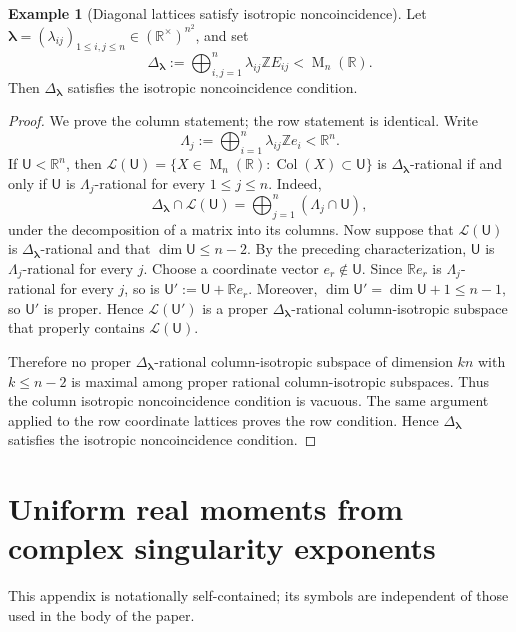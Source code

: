 \documentclass[reqno,11pt]{amsart}
\numberwithin{equation}{section}
\theoremstyle{definition}
\newtheorem{example}[theorem]{Example}
\theoremstyle{remark}
\newcommand{\op}{\operatorname}
\newcommand{\M}{\op{M}}
\begin{document}
\begin{example}[Diagonal lattices satisfy isotropic noncoincidence]
\label{ex:diagonal-isotropically-noncoincident}
Let $\boldsymbol\lambda=(\lambda_{ij})_{1\le i,j\le n}\in(\mathbb R^\times)^{n^2}$, and set
$$
\Delta_{\boldsymbol\lambda}
:=
\bigoplus_{i,j=1}^n \lambda_{ij}\mathbb Z E_{ij}
<\M_n(\mathbb R).
$$
 Then $\Delta_{\boldsymbol\lambda}$ satisfies the
isotropic noncoincidence condition.
\end{example}

\begin{proof}
We prove the column statement; the row statement is identical. Write
$$
\Lambda_j:=\bigoplus_{i=1}^n \lambda_{ij}\mathbb Z e_i<\mathbb R^n.
$$
 If
$\mathsf U<\mathbb R^n$, then
$\mathcal L(\mathsf U)=\{X\in\M_n(\mathbb R):\operatorname{Col}(X)\subset \mathsf U\}$
is $\Delta_{\boldsymbol\lambda}$-rational if and only if $\mathsf U$ is $\Lambda_j$-rational for every $1\le j\le n$. Indeed,
$$
\Delta_{\boldsymbol\lambda}\cap \mathcal L(\mathsf U)
=
\bigoplus_{j=1}^n(\Lambda_j\cap \mathsf U),
$$
under the decomposition of a matrix into its columns.
Now suppose that $\mathcal L(\mathsf U)$ is
$\Delta_{\boldsymbol\lambda}$-rational and that
$\dim\mathsf U\le n-2$. By the preceding characterization,
$\mathsf U$ is $\Lambda_j$-rational for every $j$. Choose a coordinate
vector $e_r\notin\mathsf U$. Since $\mathbb Re_r$ is
$\Lambda_j$-rational for every $j$, so is
$
\mathsf U':=\mathsf U+\mathbb Re_r.
$
Moreover,
$
\dim\mathsf U'=\dim\mathsf U+1\le n-1,
$
so $\mathsf U'$ is proper. Hence
$\mathcal L(\mathsf U')$ is a proper
$\Delta_{\boldsymbol\lambda}$-rational column-isotropic subspace that
properly contains $\mathcal L(\mathsf U)$.


Therefore no proper $\Delta_{\boldsymbol\lambda}$-rational
column-isotropic subspace of dimension $kn$ with $k\le n-2$ is maximal
among proper rational column-isotropic subspaces. Thus the column isotropic
noncoincidence condition is vacuous. The same argument applied to the row
coordinate lattices proves the row condition. Hence
$\Delta_{\boldsymbol\lambda}$ satisfies the isotropic noncoincidence
condition.
\end{proof}


\appendix

\section{Uniform real moments from complex singularity exponents}
\label{app:analytic-stability}
This appendix is notationally self-contained; its symbols are independent of those used in the body of the paper. 
\end{document}
